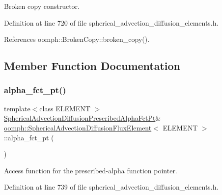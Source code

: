 Broken copy constructor. 



Definition at line 720 of file spherical\+\_\+advection\+\_\+diffusion\+\_\+elements.\+h.



References oomph\+::\+Broken\+Copy\+::broken\+\_\+copy().



\subsection{Member Function Documentation}
\mbox{\label{classoomph_1_1SphericalAdvectionDiffusionFluxElement_ab84762e928d94711e2f77339c3f9ee49}} 
\subsubsection{\texorpdfstring{alpha\+\_\+fct\+\_\+pt()}{alpha\_fct\_pt()}}
{\footnotesize\ttfamily template$<$class E\+L\+E\+M\+E\+NT $>$ \\
\hyperlink{classoomph_1_1SphericalAdvectionDiffusionFluxElement_aabc503a4eeac639334283e7297b88423}{Spherical\+Advection\+Diffusion\+Prescribed\+Alpha\+Fct\+Pt}\& \hyperlink{classoomph_1_1SphericalAdvectionDiffusionFluxElement}{oomph\+::\+Spherical\+Advection\+Diffusion\+Flux\+Element}$<$ E\+L\+E\+M\+E\+NT $>$\+::alpha\+\_\+fct\+\_\+pt (\begin{DoxyParamCaption}{ }\end{DoxyParamCaption})\hspace{0.3cm}{\ttfamily [inline]}}



Access function for the prescribed-\/alpha function pointer. 



Definition at line 739 of file spherical\+\_\+advection\+\_\+diffusion\+\_\+elements.\+h.

\mbox{\label{classoomph_1_1SphericalAdvectionDiffusionFluxElement_a3e9d700a25464270aae4cfb8ac0abb66}} 
